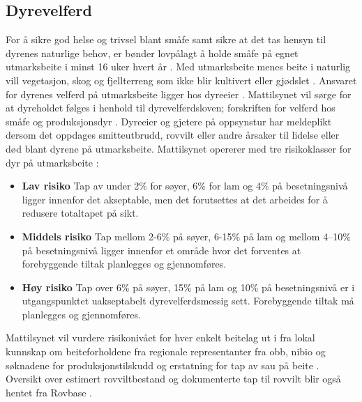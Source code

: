 \subsection{Dyrevelferd} \label{dyrevelferd}
For å sikre god helse og trivsel blant småfe samt sikre at det tas hensyn til dyrenes naturlige behov, er bønder lovpålagt å holde småfe på egnet utmarksbeite i minst 16 uker hvert år \cite{2005ForskriftSmafe}. Med utmarksbeite menes beite i naturlig vill vegetasjon, skog og fjellterreng som ikke blir kultivert eller gjødslet \cite[~s.55]{BungerSmafenaring2018}. Ansvaret for dyrenes velferd på utmarksbeite ligger hos dyreeier \cite{Mattilsynet2019TapRovvilt}. Mattilsynet vil sørge for at dyreholdet følges i henhold til dyrevelferdsloven; forskriften for velferd hos småfe og produksjonsdyr \cite{Mattilsynet2019TapRovvilt}. Dyreeier og gjetere på oppsynstur har meldeplikt dersom det oppdages smitteutbrudd, rovvilt eller andre årsaker til lidelse eller død blant dyrene på utmarksbeite. Mattilsynet opererer med tre risikoklasser for dyr på utmarksbeite \cite[~s.6]{Mattilsynet2019TapRovvilt}: 

\begin{itemize}
    \item \textbf{Lav risiko}
    \newline
    Tap av under 2\% for søyer, 6\% for lam og 4\% på besetningsnivå ligger innenfor det akseptable, men det forutsettes at det arbeides for å redusere totaltapet på sikt.
    \item \textbf{Middels risiko}
    \newline
    Tap mellom 2-6\% på søyer, 6-15\% på lam og mellom 4–10\% på besetningsnivå ligger innenfor et område hvor det forventes at forebyggende tiltak planlegges og gjennomføres.
    \item \textbf{Høy risiko}
    \newline
    Tap over 6\% på søyer, 15\% på lam og 10\% på besetningsnivå er i utgangspunktet uakseptabelt dyrevelferdsmessig sett. Forebyggende tiltak må planlegges og gjennomføres. 
\end{itemize}

\noindent
Mattilsynet vil vurdere risikonivået for hver enkelt beitelag ut i fra lokal kunnskap om beiteforholdene fra regionale representanter fra \acrlong{obb}, \acrfull{nibio} og søknadene for produksjonstilskudd og erstatning for tap av sau på beite \cite{Mattilsynet2019TapRovvilt}. Oversikt over estimert rovviltbestand og dokumenterte tap til rovvilt blir også hentet fra Rovbase \cite{Mattilsynet2019TapRovvilt}. 


